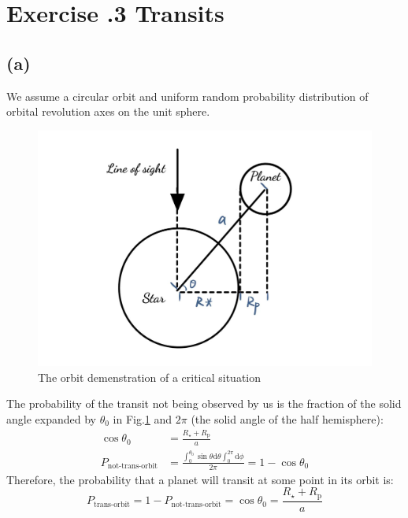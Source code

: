 \documentclass[a4paper,12pt]{article}
\begin{document}
\section*{\textbf{Exercise \uppercase\expandafter{}.3 Transits}}
\subsection*{(a)}
We assume a circular orbit and uniform random probability distribution of orbital revolution axes on the unit sphere.
\begin{figure}[htbp]
    \centering
    \includegraphics[width=12cm]{orbit.jpg}
    \caption{The orbit demenstration of a critical situation}
    \label{orbit}
\end{figure}

The probability of the transit not being observed by us is the fraction of 
the solid angle expanded by $\theta_0$ in Fig.\ref{orbit} and $2\pi$ (the solid angle of the half hemisphere):
\begin{align}
    \cos \theta_0 &= \frac{R_{\star}+R_\text{p}}{a} \\
    P_{\text{not-trans-orbit}} &= \frac{\int_{0}^{\theta_0}  \sin\theta \text{d}\theta \int_{0}^{2\pi} \text{d}\phi}{2 \pi}
                    = 1-\cos \theta_0
\end{align}
Therefore, the probability that a planet will transit at some point in its orbit is:
\begin{equation}
    P_{\text{trans-orbit}} = 1 - P_{\text{not-trans-orbit}} = \cos \theta_0 = \frac{R_{\star} + R_{\text{p}}}{a}
\end{equation}
\end{document}
